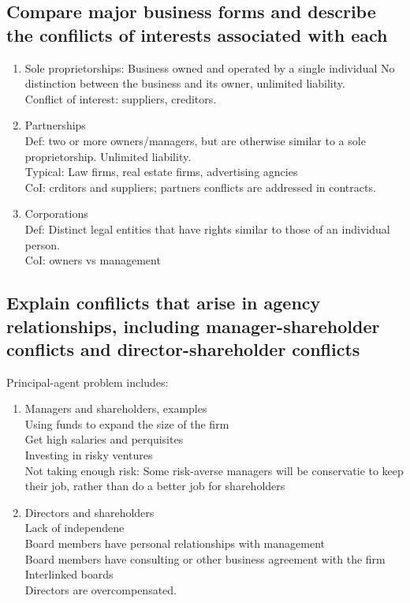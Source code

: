 \documentclass{article}
\newcommand{\be}{\begin{enumerate}}
\newcommand{\ee}{\end{enumerate}}
\begin{document}
\subsection{Compare major business forms and describe the confilicts of interests
associated with each}
\be
    \item Sole proprietorships: Business owned and operated by a single individual
        No distinction between the business and its owner, unlimited liability.
        \\Conflict of interest: suppliers, creditors.
    \item Partnerships
        \\Def: two or more owners/managers, but are otherwise similar to a sole proprietorship.
        Unlimited liability.
        \\Typical: Law firms, real estate firms, advertising agncies
        \\CoI: crditors and suppliers; partners conflicts are addressed in contracts.
    \item Corporations
        \\Def: Distinct legal entities that have rights similar to those of an individual
        person.
        \\CoI: owners vs management
\ee
\subsection{Explain confilicts that arise in agency relationships, including
manager-shareholder conflicts and director-shareholder conflicts}
Principal-agent problem includes:
\be
    \item Managers and shareholders, examples
        \\Using funds to expand the size of the firm
        \\Get high salaries and perquisites
        \\Investing in risky ventures
        \\Not taking enough risk: Some risk-averse managers will be conservatie
        to keep their job, rather than do a better job for shareholders 
    \item Directors and shareholders
        \\Lack of independene
        \\Board members have personal relationships with management
        \\Board members have consulting or other business agreement with the firm
        \\Interlinked boards
        \\Directors are overcompensated.
\ee
\end{document}
